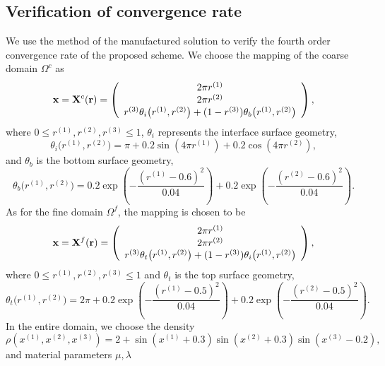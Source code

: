 \subsection{Verification of convergence rate}\label{convergence_study}
We use the method of the manufactured solution to verify the fourth order convergence rate of the proposed scheme. We choose the mapping of the coarse domain $\Omega^c$ as
\[ {\bf x} = {\bf X}^c({\bf r}) = \left(\begin{array}{c}
2\pi r^{(1)} \\
2\pi r^{(2)} \\
r^{(3)}\theta_i\big(r^{(1)},r^{(2)}\big) + (1-r^{(3)})\theta_b\big(r^{(1)},r^{(2)}\big) \end{array}\right), \]
where $0\leq r^{(1)}, r^{(2)}, r^{(3)}\leq 1$, $\theta_i$ represents the interface surface geometry,
\begin{equation}\label{iterface_geometry}
\theta_i\big(r^{(1)},r^{(2)}\big) = \pi+0.2\sin(4\pi r^{(1)})+0.2\cos(4\pi r^{(2)}),
\end{equation}
and $\theta_b$ is the bottom surface geometry,
\begin{equation*}\label{bottom_geometry}
\theta_b\big(r^{(1)},r^{(2)}\big) = 0.2\exp\left(-\frac{(r^{(1)}-0.6)^2}{0.04}\right)+0.2\exp\left(-\frac{(r^{(2)}-0.6)^2}{0.04}\right).
\end{equation*}
As for the fine domain $\Omega^f$, the mapping is chosen to be
\[ {\bf x} = {\bf X}^f({\bf r}) = \left(\begin{array}{c}
2\pi r^{(1)}\\
2\pi r^{(2)}\\
r^{(3)}\theta_t\big(r^{(1)},r^{(2)}\big) + (1-r^{(3)})\theta_i\big(r^{(1)},r^{(2)}\big) \end{array}\right), \]
where $0\leq r^{(1)}, r^{(2)}, r^{(3)}\leq 1$ and $\theta_t$ is the top surface geometry,
\begin{equation*}\label{top_geometry}
\theta_t\big(r^{(1)},r^{(2)}\big) = 2\pi+0.2\exp\left(-\frac{(r^{(1)}-0.5)^2}{0.04}\right)+0.2\exp\left(-\frac{(r^{(2)}-0.5)^2}{0.04}\right).
\end{equation*}
In the entire domain, we choose the density 
\begin{equation*}\label{density_function}
\rho(x^{(1)},x^{(2)},x^{(3)}) = 2 + \sin(x^{(1)}+0.3)\sin(x^{(2)}+0.3)\sin(x^{(3)}-0.2),
\end{equation*}
and material parameters $\mu, \lambda$ 

